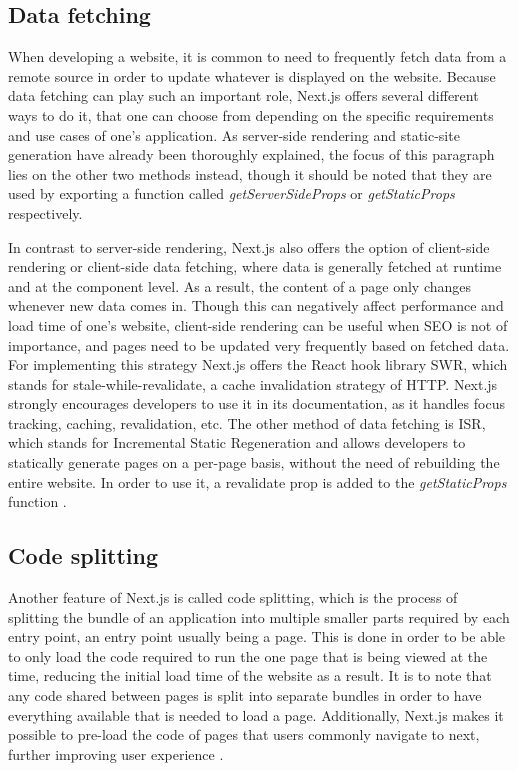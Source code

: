 \subsection{Data fetching}
When developing a website, it is common to need to frequently fetch data from a remote source in order to update whatever is displayed
on the website. Because data fetching can play such an important role, Next.js offers several different ways to do it, that one can choose
from depending on the specific requirements and use cases of one's application. As server-side rendering and static-site generation have already
been thoroughly explained, the focus of this paragraph lies on the other two methods instead, though it should be noted that they are used by
exporting a function called \emph{getServerSideProps} or \emph{getStaticProps} respectively.

In contrast to server-side rendering, Next.js also offers the
option of client-side rendering or client-side data fetching, where data is generally fetched at runtime and at the component level. As a
result, the content of a page only changes whenever new data comes in. Though this can negatively affect performance and load time of one's
website, client-side rendering can be useful when SEO is not of importance, and pages need to be updated very frequently based on fetched data.
For implementing this strategy Next.js offers the React hook library SWR, which stands for stale-while-revalidate, a cache invalidation strategy
of HTTP. Next.js strongly encourages developers to use it in its documentation, as it handles focus tracking, caching, revalidation, etc. The
other method of data fetching is ISR, which stands for Incremental Static Regeneration and allows developers to statically generate pages on a
per-page basis, without the need of rebuilding the entire website. In order to use it, a revalidate prop is added to the \emph{getStaticProps} function \cite{NextjsDataFetching}.
\\
\subsection{Code splitting}
Another feature of Next.js is called code splitting, which is the process of splitting the bundle of an application into multiple smaller parts
required by each entry point, an entry point usually being a page. This is done in order to be able to only load the code required to run the one
page that is being viewed at the time, reducing the initial load time of the website as a result. It is to note that any code shared between pages
is split into separate bundles in order to have everything available that is needed to load a page. Additionally, Next.js makes it possible to
pre-load the code of pages that users commonly navigate to next, further improving user experience \cite{NextjsCodeSplitting}.
\\
